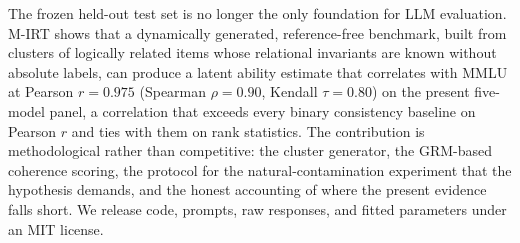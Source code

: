 \documentclass[11pt,letterpaper]{article}
\begin{document}
The frozen held-out test set is no longer the only foundation for LLM evaluation. M-IRT shows that a dynamically generated, reference-free benchmark, built from clusters of logically related items whose relational invariants are known without absolute labels, can produce a latent ability estimate that correlates with MMLU at Pearson $r = 0.975$ (Spearman $\rho = 0.90$, Kendall $\tau = 0.80$) on the present five-model panel, a correlation that exceeds every binary consistency baseline on Pearson $r$ and ties with them on rank statistics. The contribution is methodological rather than competitive: the cluster generator, the GRM-based coherence scoring, the protocol for the natural-contamination experiment that the hypothesis demands, and the honest accounting of where the present evidence falls short. We release code, prompts, raw responses, and fitted parameters under an MIT license.



\end{document}
